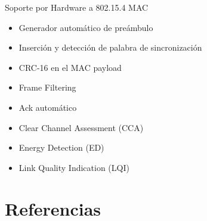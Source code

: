 \documentclass[aspectratio=169, handout]{beamer}
\begin{document}
\begin{frame}{Soporte por Hardware a 802.15.4 MAC} 
\begin{minipage}[c]{1.0\linewidth}
	\begin{minipage}[c]{0.70\linewidth}
		\begin{itemize}
			\vspace{5px}
			\item Generador automático de preámbulo	
			\vspace{5px}
			\item Inserción y detección de palabra de sincronización	
			\vspace{5px}
			\item CRC-16 en el MAC payload
			\vspace{5px}
			\item Frame Filtering
			\vspace{5px}
			\item Ack automático
			\vspace{5px}
			\item Clear Channel Assessment (CCA)
			\vspace{5px}
			\item Energy Detection (ED)
			\vspace{5px}
			\item Link Quality Indication (LQI)
		\end{itemize}
	\end{minipage}
	\begin{minipage}[c]{0.25\linewidth}
		\begin{figure}[H]
		\end{figure}	  	  	
	\end{minipage}
\end{minipage}
\end{frame}



\section{Referencias}
\end{document}
